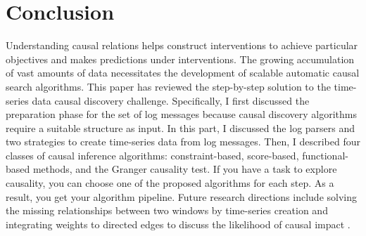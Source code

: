 \section{Conclusion}
\label{sec:6}
Understanding causal relations helps construct interventions to achieve particular objectives and makes predictions under interventions. The growing accumulation of vast amounts of data necessitates the development of scalable automatic causal search algorithms. This paper has reviewed the step-by-step solution to the time-series data causal discovery challenge. Specifically, I first discussed the preparation phase for the set of log messages because causal discovery algorithms require a suitable structure as input. In this part, I discussed the log parsers and two strategies to create time-series data from log messages. Then, I described four classes of causal inference algorithms: constraint-based, score-based, functional-based methods, and the Granger causality test. If you have a task to explore causality, you can choose one of the proposed algorithms for each step. As a result, you get your algorithm pipeline. Future research directions include solving the missing relationships between two windows by time-series creation and integrating weights to directed edges to discuss the likelihood of causal impact \cite{jarry2021quantitative}.